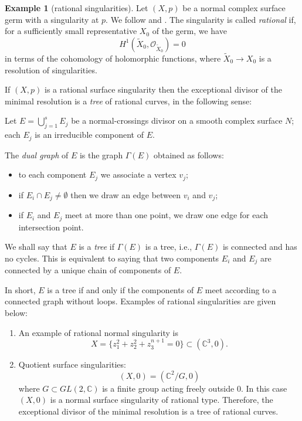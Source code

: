 \documentclass[11pt,twoside]{amsart}
\newcommand{\C}{\mathbb C}
\newcommand{\OO}{\mathcal O}
\theoremstyle{definition}
\newtheorem{exe}{Example}
\begin{document}
\begin{exe}[rational singularities]
Let $(X,p)$ be a normal complex surface germ with a singularity at $p$. We follow \cite{Artin1966} and \cite{LeDuTrangTosun2004}.
 The singularity is called \textit{rational} if, for a sufficiently small representative $X_0$ of the germ, we have
\[
H^1(\widetilde X_0,\OO_{\widetilde X_0})=0
\]
in terms of the cohomology of holomorphic functions, where $\widetilde X_0\to X_0$ is a resolution of singularities.

If $(X,p)$ is a rational surface singularity then the exceptional divisor of the minimal resolution is a \textit{tree} of rational curves, in the following sense:

Let $E=\displaystyle\bigcup_{j=1}^{s}E_j$
be a normal-crossings divisor on a smooth complex surface $N$; each $E_j$
is an irreducible component of $E$.

The \textit{dual graph} of $E$ is the graph $\Gamma(E)$ obtained as follows:
\begin{itemize}
\item to each component $E_j$ we associate a vertex $v_j$;
\item if $E_i\cap E_j\neq\emptyset$ then we draw an edge between $v_i$ and $v_j$;
\item if $E_i$ and $E_j$ meet at more than one point, we draw one edge for each intersection point.
\end{itemize}

We shall say that $E$ is a \textit{tree} if $\Gamma(E)$ is a tree, i.e., $\Gamma(E)$ is connected and has no cycles. This is equivalent to saying that two components $E_i$ and $E_j$ are connected by a unique chain of components of $E$.

In short, $E$ is a tree if and only if the components of $E$ meet according to a connected graph without loops.
Examples of rational singularities are given below:


\begin{enumerate}
\item An example of rational normal singularity is
\[
X=\{z_1^2+z_2^2+z_3^{n+1}=0\}\subset (\C^3,0).
\]

\item Quotient surface singularities:
\[
(X,0)=(\C^2/G,0)
\]
where $G\subset GL(2,\C)$ is a finite group acting freely outside $0$. In this case $(X,0)$ is a normal surface singularity of rational type. Therefore, the exceptional divisor of the minimal resolution is a tree of rational curves.


\end{enumerate}
\end{exe}
\end{document}
